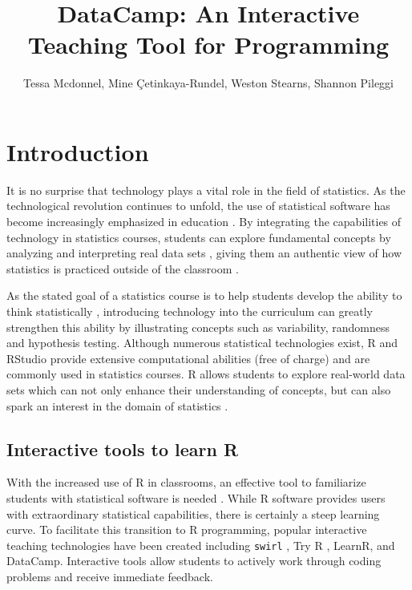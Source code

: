 \documentclass{tise_style_doi}
\title{DataCamp: An Interactive Teaching Tool for Programming}
\author{Tessa Mcdonnel, Mine \c{C}etinkaya-Rundel, Weston Stearns, Shannon Pileggi}
\begin{document}
\maketitle

\section{Introduction}


It is no surprise that technology plays a vital role in the field of statistics. As
the technological revolution continues to unfold, the use of statistical software
has become increasingly emphasized in education \citep{AmericanStatisticalAssociation2016}.
By integrating the capabilities of technology in statistics courses, students can
explore fundamental concepts by analyzing and interpreting real data sets
\citep{Chance2007, Hardin2015, Horton2014}, giving them an authentic view of how statistics
is practiced outside of the classroom \citep{Wang2017}.

As the stated goal of a statistics course is to help students develop the ability to think
statistically \citep{AmericanStatisticalAssociation2016}, introducing technology into
the curriculum can greatly strengthen this ability by illustrating concepts such as
variability, randomness and hypothesis testing. Although numerous statistical technologies
exist, R and RStudio provide extensive computational abilities (free of charge) and are
commonly used in statistics courses. R allows students to explore real-world data sets which
can not only enhance their understanding of concepts, but can also spark an interest in the
domain of statistics \citep{Wang2017}.


\subsection{Interactive tools to learn R}

With the increased use of R in classrooms, an effective tool to familiarize students
with statistical software is needed \citep{Baumer2014}. While R software provides users
with extraordinary statistical capabilities, there is certainly a steep learning curve.
To facilitate this transition to R programming, popular interactive teaching technologies
have been created including \texttt{swirl} \citep{Kross}, Try R \citep{TryR}, LearnR, and DataCamp.
Interactive tools allow students to actively work through coding problems and receive
immediate feedback.
\end{document}

